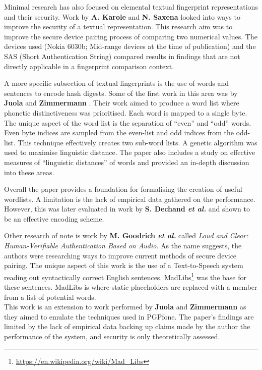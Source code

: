 Minimal research has also focused on elemental textual fingerprint representations and their security. Work by \textbf{A. Karole} and \textbf{N. Saxena}\cite{karole2009improving} looked into ways to improve the security of a textual representation. This research aim was to improve the secure device pairing process of comparing two numerical values. The devices used (Nokia 6030b; Mid-range devices at the time of publication) and the SAS (Short Authentication String) compared results in findings that are not directly applicable in a fingerprint comparison context. 

A more specific subsection of textual fingerprints is the use of words and sentences to encode hash digests. Some of the first work in this area was by \textbf{Juola} and \textbf{Zimmermann} \cite{juola1996whole}. Their work aimed to produce a word list where phonetic distinctiveness was prioritised. Each word is mapped to a single byte. The unique aspect of the word list is the separation of ``even'' and ``odd'' words. Even byte indices are sampled from the even-list and odd indices from the odd-list. This technique effectively creates two sub-word lists.  A genetic algorithm was used to maximise linguistic distance. The paper also includes a study on effective measures of ``linguistic distances'' of words and provided an in-depth discussion into these areas.

Overall the paper provides a foundation for formalising the creation of useful wordlists. A limitation is the lack of empirical data gathered on the performance. However, this was later evaluated in work by \textbf{S. Dechand \textit{et al.}}\cite{dechand2016empirical} and shown to be an effective encoding scheme.

Other research of note is work by \textbf{M. Goodrich \textit{et al.}}\cite{goodrich2006loud} called \textit{Loud and Clear: Human-Verifiable Authentication Based on Audio}. As the name suggests, the authors were researching ways to improve current methods of secure device pairing. The unique aspect of this work is the use of a Text-to-Speech system reading out syntactically correct English sentences. MadLibs\footnote{\url{https://en.wikipedia.org/wiki/Mad\_Libs}} was the base for these sentences. MadLibs is where static placeholders are replaced with a member from a list of potential words.\\
This work is an extension to work performed by \textbf{Juola} and \textbf{Zimmermann}\cite{juola1996whole} as they aimed to emulate the techniques used in PGPfone. The paper's findings are limited by the lack of empirical data backing up claims made by the author the performance of the system, and security is only theoretically assessed.

